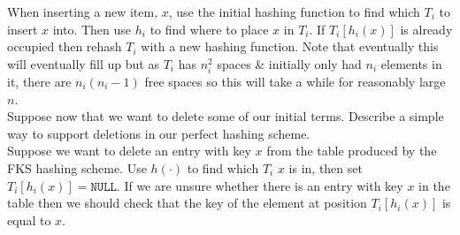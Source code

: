 \documentclass[11pt,a4paper]{article}
\begin{document}
\apart
When inserting a new item, $x$, use the initial hashing function to find which $T_i$ to insert $x$ into. Then use $h_i$ to find where to place $x$ in $T_i$. If $T_i[h_i(x)]$ is already occupied then rehash $T_i$ with a new hashing function. Note that eventually this will eventually fill up but as $T_i$ has $n_i^2$ spaces \& initially only had $n_i$ elements in it, there are $n_i(n_i-1)$ free spaces so this will take a while for reasonably large $n$.\\

\qpart
Suppose now that we want to delete some of our initial terms. Describe a simple way to support deletions in our perfect hashing scheme.\\

\apart
Suppose we want to delete an entry with key $x$ from the table produced by the FKS hashing scheme. Use $h(\cdot)$ to find which $T_i$ $x$ is in, then set $T_i[h_i(x)]=\mathtt{NULL}$. If we are unsure whether there is an entry with key $x$ in the table then we should check that the key of the element at position $T_i[h_i(x)]$ is equal to $x$.
\end{document}
